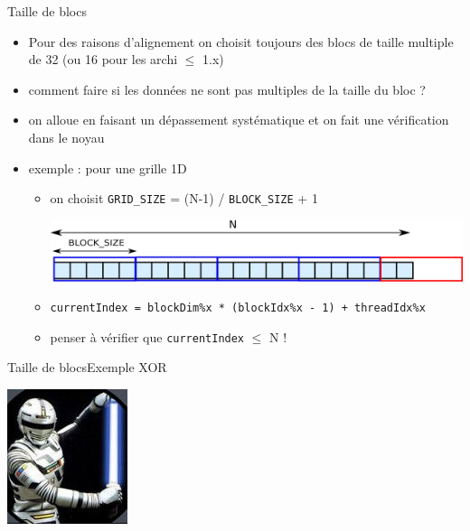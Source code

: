 \documentclass[11pt,mathserif]{beamer}
\newcommand{\scout}{\faAngellist}
\newcommand{\galde}{\faQuestion}
\newcommand{\argi}{\faLightbulbO}
\newcommand{\kontuz}{\faExclamationTriangle}
\newcommand{\egia}{\faCheckCircle}
\newif\ifC
\newcommand{\extcu}{cu}
\newcommand{\extcu}{cuf}
\newcommand{\includeSrcCu}[1]{}
\begin{document}
\begin{frame}{Taille de blocs}
  \begin{itemize}[<+->]
    \item[\scout] Pour des raisons d'alignement on choisit toujours des blocs de taille multiple de 32 (ou 16 pour les archi $\leqslant$ 1.x)
    \item[\galde] comment faire si les données ne sont pas multiples de la taille du bloc ?
    \item[\argi] on alloue en faisant un dépassement systématique et on fait une vérification dans le noyau
    \item exemple : pour une grille 1D
  \begin{itemize}
    \item[\egia] on choisit \texttt{GRID\_SIZE} = (N-1) / \texttt{BLOCK\_SIZE} + 1
\begin{center}
\includegraphics[width=0.7\linewidth]{fig/grille_1D.eps}
\end{center}
\ifC
   \item[\egia] \texttt{\small currentIndex = blockDim.x * blockIdx.x + threadIdx.x}
\else
   \item[\egia] \texttt{\small currentIndex = blockDim\%x * (blockIdx\%x - 1) + threadIdx\%x}
\fi
   \item[\kontuz] penser à vérifier que \texttt{currentIndex} \ifC $<$ \else $\leq$ \fi N !
 \end{itemize}
  \end{itemize}
\end{frame}

\begin{frame}{Taille de blocs}{Exemple XOR}
\begin{flushright}
\includegraphics[width=0.1\linewidth]{fig/xor.jpg}
\end{flushright}
  \includeSrcCu{code/overflow}
\end{frame}
\end{document}
